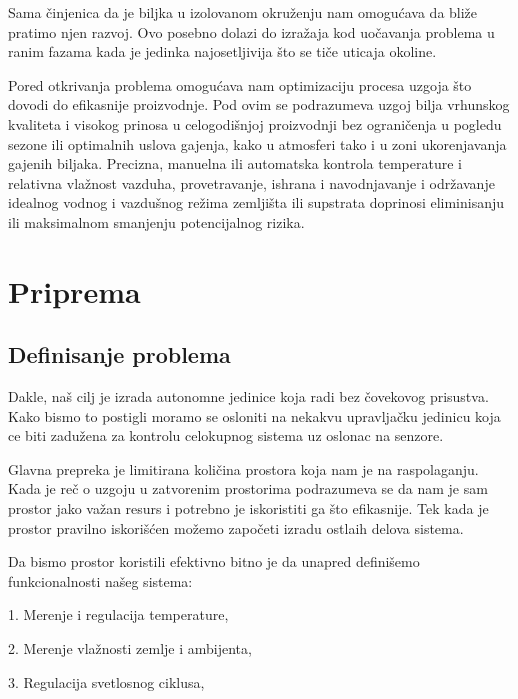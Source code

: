 \documentclass[a4paper,11pt]{book}
\makeatletter
\newenvironment{chapquote}[2][2em]
  {\setlength{\@tempdima}{#1}%
   \def\chapquote@author{#2}%
   \parshape 1 \@tempdima \dimexpr\textwidth-2\@tempdima\relax%
   \itshape}
  {\par\normalfont\hfill--\ \chapquote@author\hspace*{\@tempdima}\par\bigskip}
\makeatother
\begin{document}
\noindent Sama činjenica da je biljka u izolovanom okruženju nam omogućava da bliže pratimo njen razvoj. Ovo posebno dolazi do izražaja kod uočavanja problema u ranim fazama kada je jedinka najosetljivija što se tiče uticaja okoline.

Pored otkrivanja problema omogućava nam optimizaciju procesa uzgoja što dovodi do efikasnije proizvodnje. Pod ovim se podrazumeva uzgoj bilja vrhunskog kvaliteta i visokog prinosa u celogodišnjoj proizvodnji bez ograničenja u pogledu sezone ili optimalnih uslova gajenja, kako u atmosferi tako i u zoni ukorenjavanja gajenih biljaka. Precizna, manuelna ili automatska kontrola temperature i relativna vlažnost vazduha, provetravanje, ishrana i navodnjavanje i održavanje idealnog vodnog i vazdušnog režima zemljišta ili supstrata doprinosi eliminisanju ili maksimalnom smanjenju potencijalnog rizika.

\chapter{Priprema}


\section{Definisanje problema}
Dakle, naš cilj je izrada autonomne jedinice koja radi bez čovekovog prisustva. Kako bismo to postigli moramo se osloniti na nekakvu upravljačku jedinicu koja ce biti zadužena za kontrolu celokupnog sistema uz oslonac na senzore. 

Glavna prepreka je limitirana količina prostora koja nam je na raspolaganju. Kada je reč o uzgoju u zatvorenim prostorima podrazumeva se da nam je sam prostor jako važan resurs i potrebno je iskoristiti ga što efikasnije. Tek kada je prostor pravilno iskorišćen možemo započeti izradu ostlaih delova sistema.

Da bismo prostor koristili efektivno bitno je da unapred definišemo funkcionalnosti našeg sistema: 

\hrulefill

1. Merenje i regulacija temperature,

2. Merenje vlažnosti zemlje i ambijenta,

3. Regulacija svetlosnog ciklusa,
\end{document}

